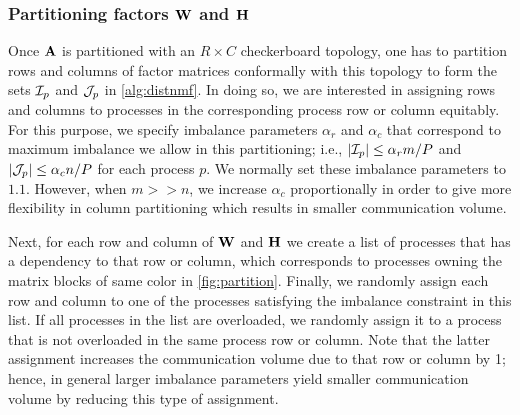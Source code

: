\subsubsection{Partitioning factors $\mathbf{W}$ and $\mathbf{H}$}
Once $\mathbf{A}$ is partitioned with an $R \times C$ checkerboard topology, one has to partition rows and columns of factor matrices conformally with this topology to form the sets $\mathcal{I}_p$ and $\mathcal{J}_p$ in \cref{alg:distnmf}.
In doing so, we are interested in assigning rows and columns to processes in the corresponding process row or column equitably.
For this purpose, we specify imbalance parameters $\alpha_r$ and $\alpha_c$ that correspond to maximum imbalance we allow in this partitioning; i.e., $|\mathcal{I}_p| \le \alpha_r m / P$ and $|\mathcal{J}_p| \le \alpha_c n / P$ for each process $p$.
We normally set these imbalance parameters to $1.1$.
However, when $m >> n$, we increase $\alpha_c$ proportionally in order to give more flexibility in column partitioning which results in smaller communication volume.

Next, for each row and column of $\mathbf{W}$ and $\mathbf{H}$ we create a list of processes that has a dependency to that row or column, which corresponds to processes owning the matrix blocks of same color in \cref{fig:partition}.
Finally, we randomly assign each row and column to one of the processes satisfying the imbalance constraint in this list.
If all processes in the list are overloaded, we randomly assign it to a process that is not overloaded in the same process row or column.
Note that the latter assignment increases the communication volume due to that row or column by 1; hence, in general larger imbalance parameters yield smaller communication volume by reducing this type of assignment.

